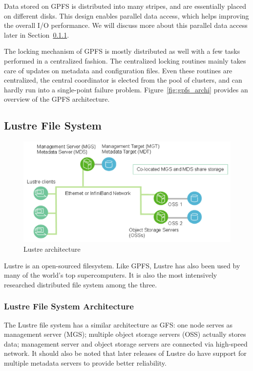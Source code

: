 Data stored on GPFS is distributed into many stripes, and are essentially
placed on different disks.
%
This design enables parallel data access, which helps improving the overall
I/O performance.
%
We will discuss more about this parallel data access later in Section~\ref{}.

The locking mechanism of GPFS is mostly distributed as well with a few tasks
performed in a centralized fashion.
%
The centralized locking routines mainly takes care of updates on metadata
and configuration files.
%
Even these routines are centralized, the central coordinator is elected from
the pool of clusters, and can hardly run into a single-point failure problem.
%
Figure~\ref{fig:gpfs_archi} provides an overview of the GPFS architecture.



\subsection{Lustre File System}
\label{sec:archi_lustre}
%
\begin{figure}
\centering
\includegraphics[width=0.99\columnwidth]{image/lustre_architecture.png}
\caption{Lustre architecture}
\label{fig:lustre_archi}
\end{figure}
%
Lustre is an open-sourced filesystem. 
%
Like GPFS, Lustre has also been used by many of the world's top supercomputers.
%
It is also the most intensively researched distributed file system among 
the three. 

\subsubsection{Lustre File System Architecture}
The Lustre file system has a similar architecture as GFS:
one node serves as management server (MGS); 
multiple object storage servers (OSS) actually stores data;
management server and object storage servers are connected via
high-speed network.
%
It should also be noted that later releases of Lustre do have support
for multiple metadata servers to provide better reliability.

